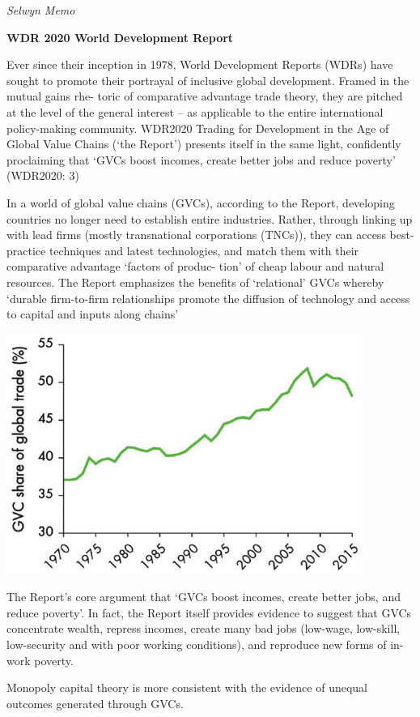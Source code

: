 \documentclass[
]{book}
\begin{document}
\emph{Selwyn Memo}

\textbf{WDR 2020 World Development Report}

Ever since their inception in 1978, World Development Reports (WDRs) have sought to
promote their portrayal of inclusive global development. Framed in the mutual gains rhe-
toric of comparative advantage trade theory, they are pitched at the level of the general
interest -- as applicable to the entire international policy-making community. WDR2020
Trading for Development in the Age of Global Value Chains (`the Report') presents itself in
the same light, confidently proclaiming that `GVCs boost incomes, create better jobs and
reduce poverty' (WDR2020: 3)

In a world of global value chains (GVCs), according to the Report, developing countries
no longer need to establish entire industries. Rather, through linking up with lead firms
(mostly transnational corporations (TNCs)), they can access best-practice techniques and
latest technologies, and match them with their comparative advantage `factors of produc-
tion' of cheap labour and natural resources.
The Report emphasizes the benefits of
`relational' GVCs whereby `durable firm-to-firm relationships promote the diffusion of
technology and access to capital and inputs along chains'

\includegraphics{fig/gvc_trade.png}

The Report's core argument that `GVCs boost incomes, create better jobs, and reduce poverty'.
In fact, the Report itself provides evidence to suggest that GVCs concentrate wealth, repress
incomes, create many bad jobs (low-wage, low-skill, low-security and with poor working
conditions), and reproduce new forms of in-work poverty.

Monopoly capital theory is more consistent with the evidence
of unequal outcomes generated through GVCs.
\end{document}
